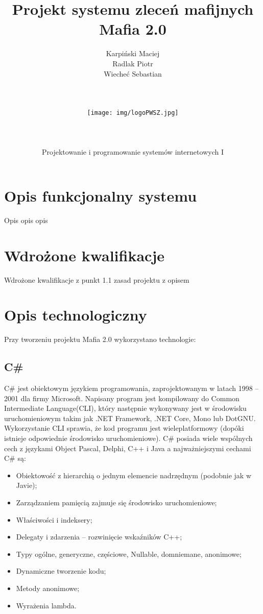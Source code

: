 \documentclass[12pt,a4paper]{article}
\author{Karpiński Maciej\\Radlak Piotr\\Wiecheć Sebastian\\\\\\\\\texttt{[image: img/logoPWSZ.jpg]}\\\\\\\\Projektowanie i programowanie systemów internetowych I}
\title{Projekt systemu zleceń mafijnych\\Mafia 2.0}
\begin{document}
	\maketitle
	\newpage

	\tableofcontents
	\newpage

	\section{Opis funkcjonalny systemu}
		Opis opis opis
	
	\section{Wdrożone kwalifikacje}
		Wdrożone kwalifikacje z punkt 1.1 zasad projektu z opisem
	
	\section{Opis technologiczny}
		Przy tworzeniu projektu Mafia 2.0 wykorzystano technologie:

		\subsection{C\#}
			C\# jest obiektowym językiem programowania, zaprojektowanym w latach 1998 – 2001 dla firmy Microsoft.
			Napisany program jest kompilowany do Common Intermediate Language(CLI), który następnie wykonywany jest w środowisku uruchomieniowym takim jak .NET Framework,
			.NET Core, Mono lub DotGNU.
			Wykorzystanie CLI sprawia, że kod programu jest wieleplatformowy (dopóki istnieje odpowiednie środowisko uruchomieniowe).
			C\# posiada wiele wspólnych cech z językami Object Pascal, Delphi, C++ i Java a najważniejszymi cechami C\# są:
			\begin{itemize}
				\item Obiektowość z hierarchią o jednym elemencie nadrzędnym (podobnie jak w Javie);
				\item Zarządzaniem pamięcią zajmuje się środowisko uruchomieniowe;
				\item Właściwości i indeksery;
				\item Delegaty i zdarzenia – rozwinięcie wskaźników C++;
				\item Typy ogólne, generyczne, częściowe, Nullable, domniemane, anonimowe;
				\item Dynamiczne tworzenie kodu;
				\item Metody anonimowe;
				\item Wyrażenia lambda.
			\end{itemize}
			
\end{document}
